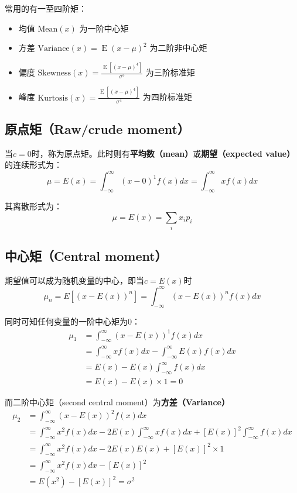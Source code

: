 \documentclass[11pt]{article}
\newcommand{\E}{\operatorname{E}}
\begin{document}
常用的有一至四阶矩：
\begin{itemize}
    \setlength{\itemsep}{0em}
    \item 均值 $\text{Mean}(x)$ 为一阶中心矩
    \item 方差 $\text{Variance}(x) = \E(x-\mu)^2$ 为二阶非中心矩
    \item 偏度 $\text{Skewness}(x) = \frac{\E[(x-\mu)^4]}{\sigma^3}$ 为三阶标准矩 
    \item 峰度 $\text{Kurtosis}(x) = \frac{\E[(x-\mu)^4]}{\sigma^4}$ 为四阶标准矩
\end{itemize}

\subsection{原点矩（Raw/crude moment）}

当$c=0$时，称为原点矩。此时则有\textbf{平均数（mean）}或\textbf{期望（expected value）}的连续形式为：
\begin{equation*}
    \mu = E(x) = \int_{-\infty}^{\infty} (x-0)^1 f(x) dx =
    \int_{-\infty}^{\infty} x f(x) dx
\end{equation*}

其离散形式为：
\begin{equation*}
    \mu = E(x) = \sum_i x_i p_i
\end{equation*}

\subsection{中心矩（Central moment）}

期望值可以成为随机变量的中心，即当$c=E(x)$时
\begin{equation*}
    \mu_n = E[(x-E(x))^n] = \int_{-\infty}^{\infty} (x-E(x))^n f(x) dx
\end{equation*}

同时可知任何变量的一阶中心矩为0：
\begin{align*}
    \mu_1 &= \int_{-\infty}^{\infty} (x-E(x))^1 f(x) dx \\
    &= \int_{-\infty}^{\infty} x f(x) dx - \int_{-\infty}^{\infty} E(x) f(x) dx \\
    &= E(x) - E(x) \int_{-\infty}^{\infty} f(x) dx \\
    &= E(x) - E(x) \times 1 = 0 
\end{align*}

而二阶中心矩（second central moment）为\textbf{方差（Variance）}
\begin{align*}
    \mu_2 &= \int_{-\infty}^{\infty} (x-E(x))^2 f(x) dx \\
    &= \int_{-\infty}^{\infty} x^2 f(x)dx - 2 E(x) \int_{-\infty}^{\infty} x f(x)dx + [E(x)]^2\int_{-\infty}^{\infty}f(x)dx \\
    &= \int_{-\infty}^{\infty} x^2 f(x)dx - 2 E(x) E(x) + [E(x)]^2\times 1 \\
    &= \int_{-\infty}^{\infty} x^2 f(x)dx - [E(x)]^2 \\
    &= E(x^2) - [E(x)]^2 = \sigma^2
\end{align*}
\end{document}

